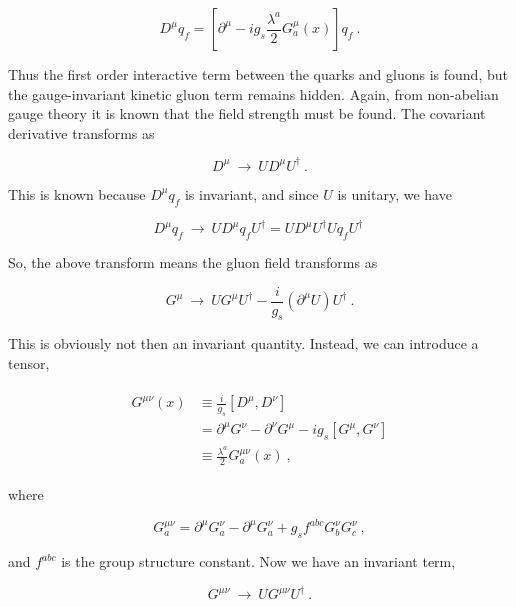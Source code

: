 \documentclass[10pt,twoside]{report}
\begin{document}
	\begin{equation}
	D^\mu q_f = \left[ \partial^\mu - ig_s\frac{\lambda^a}{2}G_a^\mu(x) \right]q_f \:.
	\end{equation}
	
	Thus the first order interactive term between the quarks and gluons is found, but the gauge-invariant kinetic gluon term remains hidden. Again, from non-abelian gauge theory it is known that the field strength must be found. The covariant derivative transforms as
	
	\begin{equation}
	D^\mu \:\rightarrow\: UD^\mu U^\dagger\:.
	\end{equation}
	
	This is known because $D^\mu q_f$ is invariant, and since $U$ is unitary, we have
	
	\begin{equation}
		D^\mu q_f \:\rightarrow\: UD^\mu q_fU^\dagger = UD^\mu U^\dagger U q_fU^\dagger\:
	\end{equation}
	
	So, the above transform means the gluon field transforms as
	
	\begin{equation}
	G^\mu \:\rightarrow\: UG^\mu U^\dagger - \frac{i}{g_s}(\partial^\mu U)U^\dagger\:.
	\end{equation}
	
	This is obviously not then an invariant quantity. Instead, we can introduce a tensor,
	
	\begin{align}
		\begin{split}
		G^{\mu\nu}(x) &\equiv \frac{i}{g_s}[D^\mu,D^\nu]\\
		&= \partial^\mu G^\nu - \partial^\nu G^\mu - ig_s[G^\mu,G^\nu]\\
		&\equiv \frac{\lambda^a}{2}G_a^{\mu\nu}(x)\:,
		\end{split}
	\end{align}
	
	\noindent where
	
	\begin{equation}
	G_a^{\mu\nu} = \partial^\mu G_a^\nu - \partial^\mu G_a^\nu + g_sf^{abc}G_b^\nu G_c^\nu\:,
	\end{equation}
	
	\noindent and $f^{abc}$ is the group structure constant. Now we have an invariant term,
	
	\begin{equation}
	G^{\mu\nu} \:\rightarrow\: UG^{\mu\nu}U^\dagger\:.
	\end{equation}
	
\end{document}
